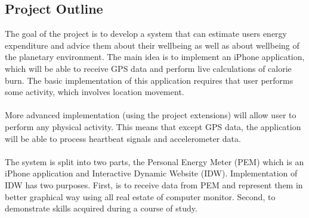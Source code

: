\documentclass[12pt, a4paper]{report}   %
\begin{document}
\subsection{Project Outline}
The goal of the project is to develop a system that can estimate users energy expenditure and advice them about their wellbeing as well as about wellbeing of the planetary environment. The main idea is to implement an iPhone application, which will be able to receive GPS data and perform live calculations of calorie burn. The basic implementation of this application requires that user performs some activity, which involves location movement.\\ \\
More advanced implementation (using the project extensions) will allow user to perform any physical activity. This means that except GPS data, the application will be able to process heartbeat signals and accelerometer data.\\ \\
The system is split into two parts, the Personal Energy Meter (PEM) which is an iPhone application and Interactive Dynamic Website (IDW). Implementation of IDW has two purposes. First, is to receive data from PEM and represent them in better graphical way using all real estate of computer monitor. Second, to demonstrate skills acquired during a course of study.

\end{document}
